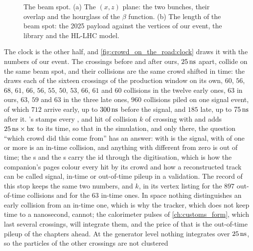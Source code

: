 \begin{figure}[htbp]\centering
\resizebox{\textwidth}{!}{}
\caption[The beam spot of 2025: the two bunches and the numbers of the
payload]{The beam spot. (a) The $(x,z)$ plane: the two bunches, their
overlap and the hourglass of the $\beta$ function. (b) The length of the
beam spot: the 2025 payload against the vertices of our event, the
\CMSSW library and the HL-LHC model.}
\label{fig:crowd_on_the_road:region_sketch}
\end{figure}

The clock is the other half, and \cref{fig:crowd_on_the_road:clock}
draws it with the numbers of our event. The crossings before and after
ours, $25\,\mathrm{ns}$ apart, collide on the same beam spot, and their collisions
are the same crowd shifted in time: the \Mix draws each of the sixteen
crossings of the production window on its own, $60$, $56$, $68$, $61$,
$66$, $56$, $55$, $50$, $53$, $66$, $61$ and $60$ collisions in the
twelve early ones, $63$ in ours, $63$, $59$ and $63$ in the three late
ones, $960$ collisions piled on one signal event, of which $712$ arrive
early, up to $300\,\mathrm{ns}$ before the signal, and $185$ late, up to $75\,\mathrm{ns}$
after it. \CMSSW's  stamps every ,
 and hit of collision $k$ of crossing \bx with
 and adds $25\,\mathrm{ns}\times\mathrm{bx}$ to its time, so
that in the simulation, and only there, the question ``which crowd did
this come from'' has an answer:  with
 is the signal,  with
 of one or more is an in-time collision, and anything with
 different from zero is out of time; the
s and the s carry the id
through the digitisation, which is how the companion's pages colour
every hit by its crowd and how a reconstructed track can be called
signal, in-time or out-of-time pileup in a validation. The record of
this stop keeps the same two numbers, \bx and $k$, in its vertex listing
for the $897$ out-of-time collisions and for the $63$ in-time ones. In
space nothing distinguishes an early collision from an in-time one, which
is why the tracker, which does not keep time to a nanosecond, cannot; the
calorimeter pulses of \cref{ch:customs_form}, which last several
crossings, will integrate them, and the price of that is the out-of-time
pileup of the chapters ahead. At the generator level nothing integrates
over $25\,\mathrm{ns}$, so the particles of the other crossings are not clustered
